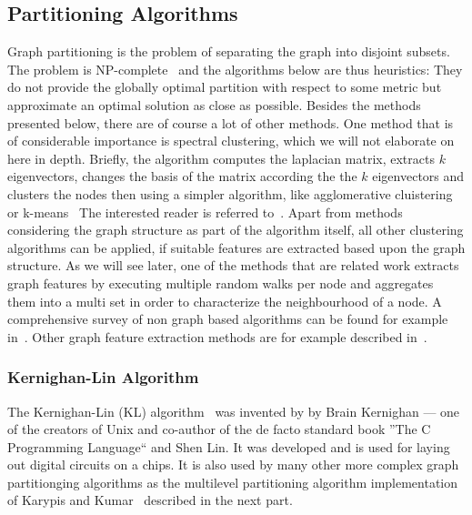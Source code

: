         \subsection{Partitioning Algorithms} 
            Graph partitioning is the problem of separating the graph into disjoint subsets. 
            The problem is NP-complete~\autocite{andreev2006balanced} and the algorithms below are thus heuristics: 
            They do not provide the globally optimal partition with respect to some metric but approximate an optimal solution as close as possible.
            Besides the methods presented below, there are of course a lot of other methods.
            One method that is of considerable importance is spectral clustering, which we will not elaborate on here in depth.
            Briefly, the algorithm computes the laplacian matrix, extracts $k$ eigenvectors, changes the basis of the matrix according the the $k$ eigenvectors and clusters the nodes then using a simpler algorithm, like agglomerative cluistering~\autocite{hac} or k-means~\autocite{lloyd1982least}
            The interested reader is referred to~\autocite{spectral, uvl, ng}.
            Apart from methods considering the graph structure as part of the algorithm itself, all other clustering algorithms can be applied, if suitable features are extracted based upon the graph structure.
            As we will see later, one of the methods that are related work extracts graph features by executing multiple random walks per node and aggregates them into a multi set in order to characterize the neighbourhood of a node.
            A comprehensive survey of non graph based algorithms can be found for example in~\autocite{overview_clust, berkhin2006survey, xu2005survey, han2011data}.
            Other graph feature extraction methods are for example described in~\autocite{neumann2011characteristic, henderson2011s, henderson2012rolx}.
            
            
            \subsubsection*{Kernighan-Lin Algorithm}\label{kla}
                The Kernighan-Lin (KL) algorithm~\autocite{kl} was invented by by Brain Kernighan --- one of the creators of Unix and co-author of the de facto standard book ''The C Programming Language`` and  Shen Lin.
                It was developed and is used for laying out digital circuits on a chips. 
                It is also used by many other more complex graph partitionging algorithms as the multilevel partitioning algorithm implementation of Karypis and Kumar~\autocite{karypis} described in the next part.
                
